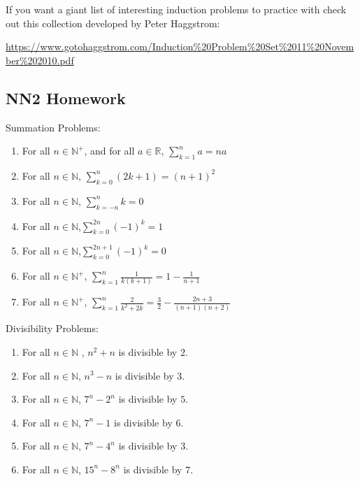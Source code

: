 If you want a giant list of interesting induction problems to practice with check out this collection developed by Peter Haggstrom:

\url{https://www.gotohaggstrom.com/Induction%20Problem%20Set%2011%20November%202010.pdf}

\subsection{NN2 Homework}

\begin{xca}
Summation Problems:

\begin{enumerate}
	\item For all $n \in \mathbb{N}^+$, and for all $a \in \mathbb{R}$, $\displaystyle \sum_{k=1}^n a = na $
	
	\item For all $n \in \mathbb{N}$, $ \displaystyle \sum_{k=0}^n (2k+1) = (n+1)^2	$
	
	\item For all $n \in \mathbb{N}$, $ \displaystyle	\sum_{k=-n}^n k = 0$
	
	\item For all $n \in \mathbb{N}$,$ \displaystyle \sum_{k=0}^{2n} (-1)^k = 1 $
	
	\item For all $n \in \mathbb{N}$,$ \displaystyle \sum_{k=0}^{2n+1} (-1)^k = 0 $
	
	\item For all $n \in \mathbb{N}^+$, $ \displaystyle \sum_{k=1}^n \frac{1}{k(k+1)} = 1 - \frac{1}{n+1}$
	
	\item For all $n \in \mathbb{N}^+$, $ \displaystyle \sum_{k=1}^n \frac{2}{k^2+2k} = \frac{3}{2} - \frac{2n+3}{(n+1)(n+2)}$
\end{enumerate}
\end{xca}

\begin{xca}
Divisibility Problems:

\begin{enumerate}
	\item For all $n \in \mathbb{N}$ , $n^2+n$ is divisible by $2$. 
	\item For all $n \in \mathbb{N}$, $n^3-n$ is divisible by $3$.
	\item For all $n \in \mathbb{N}$, $7^n - 2^n$ is divisible by $5$.
	\item For all $n \in \mathbb{N}$, $7^n - 1$ is divisible by $6$.
	\item For all $n \in \mathbb{N}$, $7^n - 4^n$ is divisible by $3$.
	\item For all $n \in \mathbb{N}$, $15^n - 8^n$ is divisible by $7$.
\end{enumerate}
\end{xca}

